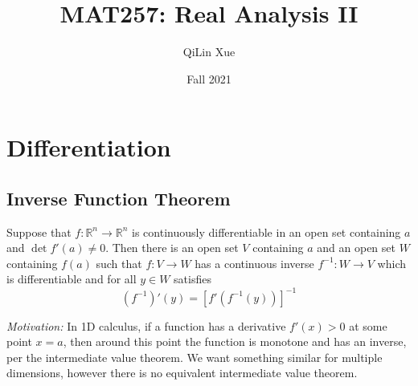 \documentclass{article}
\title{MAT257: Real Analysis II}
\author{QiLin Xue}
\date{Fall 2021}
\numberwithin{equation}{section}
\begin{document}
\maketitle
\tableofcontents
\newpage
\section{Differentiation}
\subsection{Inverse Function Theorem}
\begin{theorem}
    Suppose that $f:\mathbb{R}^n \rightarrow \mathbb{R}^n$ is continuously differentiable in an open set containing $a$ and $\det f'(a) \neq 0$. Then there is an open set $V$ containing $a$ and an open set $W$ containing $f(a)$ such that $f:V\rightarrow W$ has a continuous inverse $f^{-1}:W\rightarrow V$ which is differentiable and for all $y\in W$ satisfies
    \begin{equation}
        (f^{-1})'(y) = [f'(f^{-1}(y))]^{-1}
    \end{equation}
\end{theorem}
\textit{Motivation:} In 1D calculus, if a function has a derivative $f'(x)>0$ at some point $x=a$, then around this point the function is monotone and has an inverse, per the intermediate value theorem. We want something similar for multiple dimensions, however there is no equivalent intermediate value theorem.
\end{document}
